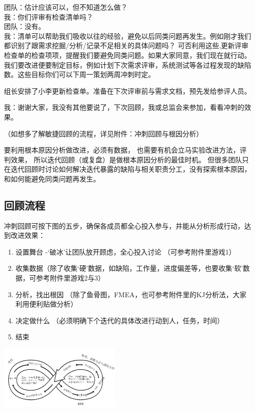团队：估计应该可以，但不知道怎么做？\\
我：你们评审有检查清单吗？\\
团队：没有。\\
我：清单可以帮助我们吸收以往的经验，避免以后同类问题再发生。例如刚才我们都识别了跟需求挖掘/分析/记录不足相关的具体问题吗？
可否利用这些,更新评审检查单的检查项项，提醒我们要避免同类问题。如果大家同意，我们现在就行动。我们要改进便要制定目标，例如计划下次需求评审，系统测试等各过程发现的缺陷数。这些目标你们可以下周一策划两周冲刺时定。

组长安排了小李更新检查单。准备在下次评审前与需求文档，预先发给参评人员。

我：谢谢大家，我没有其他要说了，下次回顾，我或总监会来参加，看看冲刺的效果。

（如想多了解敏捷回顾的流程，详见附件：冲刺回顾与根因分析）

要利用根本原因分析做改进，必须有数据，
也需要有机会立马实验改进方法，评判效果，
所以迭代回顾（或复盘）是做根本原因分析的最佳时机。
但很多团队只在迭代回顾时讨论如何解决迭代暴露的缺陷与相关职责分工，没有探索根本原因，
和如何能避免同类问题再发生。

\hypertarget{ux56deux987eux6d41ux7a0b}{%
\subsection{回顾流程}\label{ux56deux987eux6d41ux7a0b}}

冲刺回顾可按下图的五步，确保各成员都全心投入参与，并能从分析形成行动，达到改进效果：\\

\begin{enumerate}
\tightlist
\item
  设置舞台 -`破冰'让团队放开顾虑，全心投入讨论 （可参考附件里游戏1）
\item
  收集数据（除了收集`硬'数据，如缺陷，工作量，进度偏差等，也要收集`软'数据，可参考附件里游戏2与3）
\item
  分析，找出根因
  （除了鱼骨图，FMEA，也可参考附件里的KJ分析法，大家利用便利贴做分析）
\item
  决定做什么 （必须明确下个迭代的具体改进行动到人，任务，时间）
\item
  结束
\end{enumerate}


\includegraphics[width=6cm]{RetrospectiveScreenshot_2021-09-21_173119.png}

